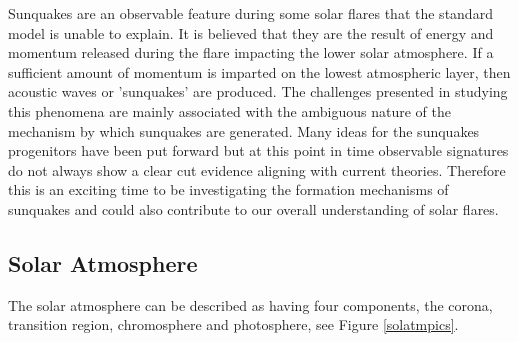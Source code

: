 Sunquakes are an observable feature during some solar flares that the standard model is unable to explain. It is believed that they are the result of energy and momentum released during the flare impacting the lower solar atmosphere. If a sufficient amount of momentum is imparted on the lowest atmospheric layer, then acoustic waves or 'sunquakes' are produced. The challenges presented in studying this phenomena are mainly associated with the ambiguous nature of the mechanism by which sunquakes are generated. Many ideas for the sunquakes progenitors have been put forward but at this point in time observable signatures do not always show a clear cut evidence aligning with current theories. Therefore this is an exciting time to be investigating the formation mechanisms of sunquakes and could also contribute to our overall understanding of solar flares.      
\subsection{Solar Atmosphere}
The solar atmosphere can be described as having four components, the corona, transition region, chromosphere and photosphere, see Figure \ref{solatmpics}.

